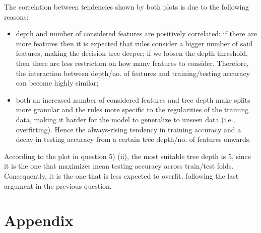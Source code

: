 \documentclass{exam}
\begin{document}
\begin{questions}
\begin{parts}
\begin{figure}[H]
            \end{figure}
        \end{parts}
        \item The correlation between tendencies shown by both plots is due to the following reasons:
        \vspace{-0.4em}
        \begin{itemize}
            \item depth and number of considered features are positively correlated: if there are more features then it is expected that rules consider a bigger number of said features, making the decision tree deeper; if we loosen the depth threshold, then there are less restriction on how many features to consider. Therefore, the interaction between depth/no. of features and training/testing accuracy can become highly similar;
            \item both an increased number of considered features and tree depth make splits more granular and the rules more specific to the regularities of the training data, making it harder for the model to generalize to unseen data (i.e., overfitting). Hence the always-rising tendency in training accuracy and a decay in testing accuracy from a certain tree depth/no. of features onwards.
        \end{itemize}
        \item According to the plot in question 5) (ii), the most suitable tree depth is 5, since it is the one that maximizes mean testing accuracy across train/test folds. Consequently, it is the one that is less expected to overfit, following the last argument in the previous question. 
    \end{questions}
    \pagebreak
    \section{Appendix}
    \inputminted{python}{src/ex02.py}
    
    
\end{document}
